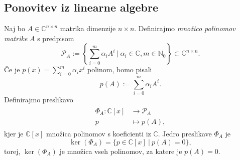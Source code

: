 \documentclass[mat1]{fmfdelo}
\newcommand{\N}{\mathbb N}
\newcommand{\C}{\mathbb C}
\begin{document}
\subsection{Ponovitev iz linearne algebre}\label{linearnaAlgebra}
Naj bo $A \in \C^{n \times n}$ matrika dimenzije $n \times n$. Definirajmo \emph{množico polinomov matrike} $A$ s predpisom
\begin{equation*}
    \mathcal{P}_A := \left\{ \sum_{i=0}^m \alpha_i A^i\ |\  \alpha_i \in \C, m \in \N_0 \right\} \subset \C^{n \times n}.
\end{equation*}
Če je $p(x) = \sum_{i=0}^m \alpha_i x^i$ polinom, bomo pisali
\begin{equation*}
    p(A) := \sum_{i=0}^m \alpha_i A^i.
\end{equation*}
Definirajmo preslikavo
\begin{align}
\begin{split}
    \Phi_A : \C [x] &\longrightarrow \mathcal{P}_A \\
    p &\longmapsto p(A),
\end{split}
\end{align}
kjer je $\C [x]$ množica polinomov s koeficienti iz $\C$. Jedro preslikave $\Phi_A$ je
\begin{equation*}
    \ker \left(\Phi_A\right) = \Big\{ p \in \C [x] \ | \  p(A) = 0 \Big\},
\end{equation*}
torej, $\ker\left(\Phi_A\right)$ je množica vseh polinomov, za katere je $p(A) = 0$.
\end{document}
